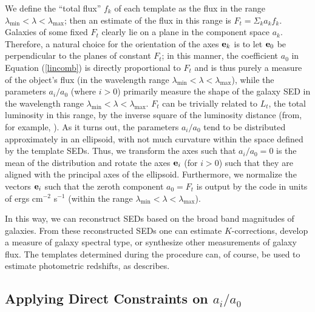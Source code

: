 \documentclass[10pt,preprint]{aastex}
\newcommand{\vv}[1]{{\bf #1}}
\begin{document}
We define the ``total flux'' $f_k$ of each template as the flux in the
range $\lambda_{\mathrm{min}}<\lambda<\lambda_{\mathrm{max}}$; then an
estimate of the flux in this range is $F_{{t}}=\Sigma_k a_k f_k$.
Galaxies of some fixed $F_t$ clearly lie on a plane in the component
space $a_k$. Therefore, a natural choice for the orientation of the
axes $\vv{e}_k$ is to let $\vv{e}_0$ be perpendicular to the planes of
constant $F_t$; in this manner, the coefficient $a_0$ in Equation
(\ref{lincomb}) is directly proportional to $F_t$ and is thus purely a
measure of the object's flux (in the wavelength range
$\lambda_{\mathrm{min}} <\lambda < \lambda_{\mathrm{max}}$), while the
parameters $a_i/a_0$ (where $i>0$) primarily measure the shape of the
galaxy SED in the wavelength range $\lambda_{\mathrm{min}} <\lambda <
\lambda_{\mathrm{max}}$. $F_t$ can be trivially related to $L_t$, the
total luminosity in this range, by the inverse square of the
luminosity distance (from, for example, \citealt{hogg99a}).  As it
turns out, the parameters $a_i/a_0$ tend to be distributed
approximately in an ellipsoid, with not much curvature within the
space defined by the template SEDs. Thus, we transform the axes such
that $a_i/a_0 = 0$ is the mean of the distribution and rotate the axes
$\vv{e}_i$ (for $i>0$) such that they are aligned with the principal
axes of the ellipsoid. Furthermore, we normalize the vectors
$\vv{e}_i$ such that the zeroth component $a_0=F_t$ is output by the
code in units of ergs cm$^{-2}$ s$^{-1}$ (within the range
$\lambda_{\mathrm{min}} <\lambda < \lambda_{\mathrm{max}}$).

In this way, we can reconstruct SEDs based on the broad band
magnitudes of galaxies. From these reconstructed SEDs one can estimate
$K$-corrections, develop a measure of galaxy spectral type, or
synthesize other measurements of galaxy flux.  The templates
determined during the procedure can, of course, be used to estimate
photometric redshifts, as \citet{csabai00a} describes.

\subsection{Applying Direct Constraints on $a_i/a_0$}
\label{direct}
\end{document}
